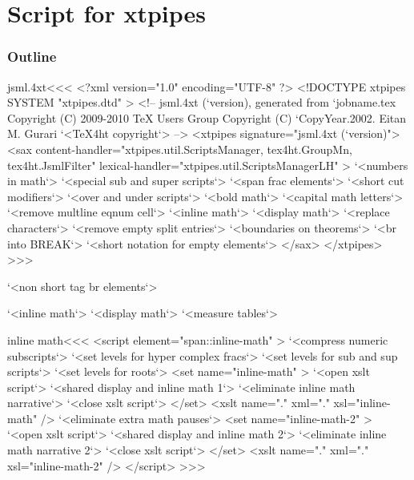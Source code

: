 \documentclass{article}
\begin{document}




\part{Script for xtpipes}


\section{Outline}




\<jsml.4xt\><<<
<?xml version="1.0" encoding="UTF-8" ?>
<!DOCTYPE xtpipes SYSTEM "xtpipes.dtd" >
<!-- jsml.4xt (`version), generated from `jobname.tex
     Copyright (C) 2009-2010 TeX Users Group
     Copyright (C) `CopyYear.2002. Eitan M. Gurari
`<TeX4ht copyright`> -->
<xtpipes signature="jsml.4xt (`version)">
   <sax content-handler="xtpipes.util.ScriptsManager, tex4ht.GroupMn, tex4ht.JsmlFilter" 
        lexical-handler="xtpipes.util.ScriptsManagerLH" >
     `<numbers in math`>
     `<special sub and super scripts`> 
     `<span frac elements`>
     `<short cut modifiers`>
     `<over and under scripts`>
     `<bold math`>
     `<capital math letters`>
     `<remove multline eqnum cell`> 
     `<inline math`>
     `<display math`>
     `<replace characters`>
     `<remove empty split entries`>
     `<boundaries on theorems`>
     `<br into BREAK`>
     `<short notation for empty elements`>
   </sax>
</xtpipes>
>>>


     `<non short tag br elements`>     

     `<inline math`>
     `<display math`>
     `<measure tables`>




\<inline math\><<<
<script element="span::inline-math" >
  `<compress numeric subscripts`>
  `<set levels for hyper complex fracs`>
  `<set levels for sub and sup scripts`>
  `<set levels for roots`>
  <set name="inline-math" >
     `<open xslt script`>
     `<shared display and inline math 1`>
     `<eliminate inline math narrative`>
     `<close xslt script`>
  </set>
  <xslt name="." xml="." xsl="inline-math" />
  `<eliminate extra math pauses`>
  <set name="inline-math-2" >
     `<open xslt script`>
     `<shared display and inline math 2`>
     `<eliminate inline math narrative 2`>
     `<close xslt script`>
  </set>
  <xslt name="." xml="." xsl="inline-math-2" />
</script> 
>>>
\end{document}
